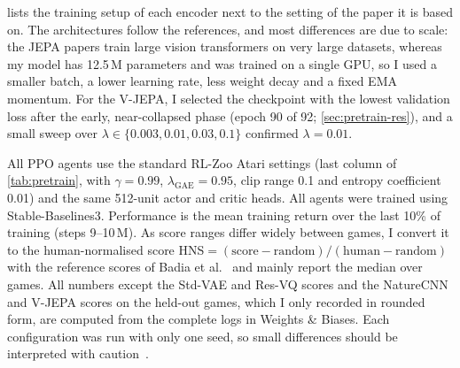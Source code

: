 \documentclass[runningheads]{llncs}
\begin{document}
 lists the training setup of each encoder next to the setting of the paper
it is based on. The architectures follow the references, and most differences are due to scale: the JEPA
papers train large vision transformers on very large datasets, whereas my model has
12.5\,M parameters and was trained on a single GPU, so I used a smaller batch, a lower learning
rate, less weight decay and a fixed EMA momentum. For the V-JEPA, I selected
the checkpoint with the lowest validation loss after the early, near-collapsed phase (epoch 90
of 92; \cref{sec:pretrain-res}), and a small sweep over
$\lambda\in\{0.003,0.01,0.03,0.1\}$ confirmed $\lambda=0.01$.

All PPO agents use the standard RL-Zoo Atari settings (last column of \cref{tab:pretrain},
with $\gamma=0.99$, $\lambda_{\text{GAE}}=0.95$, clip range 0.1 and entropy coefficient 0.01)
and the same 512-unit actor and critic heads. All agents were trained using
Stable-Baselines3. Performance is the mean training return over the last 10\% of training (steps 9--10\,M). As
score ranges differ widely between games, I convert it to the human-normalised score
HNS$=(\text{score}-\text{random})/(\text{human}-\text{random})$ with the reference scores of
Badia et al.~\cite{badia2020agent57} and mainly report the median over games. All numbers
except the Std-VAE and Res-VQ scores and the NatureCNN and V-JEPA scores on the held-out games,
which I only recorded in rounded form, are computed from the complete logs in Weights \& Biases. Each configuration was run with only one
seed, so small differences should be interpreted with caution~\cite{agarwal2021precipice}.
\end{document}
